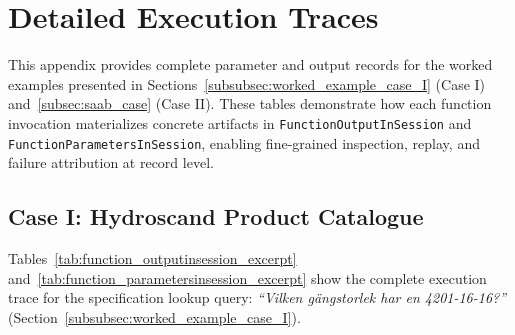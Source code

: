 \section{Detailed Execution Traces}
\label{app:detailed_traces}

This appendix provides complete parameter and output records for the worked examples presented in Sections~\ref{subsubsec:worked_example_case_I} (Case I) and~\ref{subsec:saab_case} (Case II). These tables demonstrate how each function invocation materializes concrete artifacts in \texttt{FunctionOutputInSession} and \texttt{FunctionParametersInSession}, enabling fine-grained inspection, replay, and failure attribution at record level.

\subsection{Case I: Hydroscand Product Catalogue}
\label{app:detailed_traces_case1}

Tables~\ref{tab:function_outputinsession_excerpt} and~\ref{tab:function_parametersinsession_excerpt} show the complete execution trace for the specification lookup query: \emph{``Vilken gängstorlek har en 4201-16-16?''} (Section~\ref{subsubsec:worked_example_case_I}).

